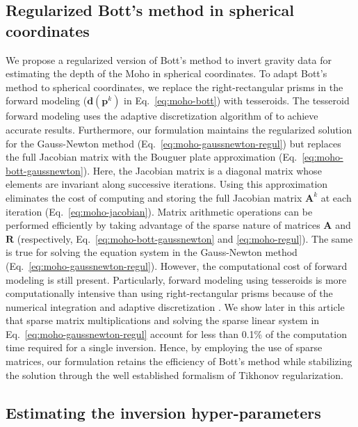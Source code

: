 \subsection{Regularized Bott's method in spherical coordinates}

We propose a regularized version of Bott's method to invert gravity data for
estimating the depth of the Moho in spherical coordinates.
To adapt Bott's method to spherical coordinates,
we replace the right-rectangular prisms in the forward modeling
($\mathbf{d}(\mathbf{p}^k)$ in Eq.~\ref{eq:moho-bott})
with tesseroids.
The tesseroid forward modeling uses the adaptive discretization algorithm
of \citet{uieda2016} to achieve accurate results.
Furthermore, our formulation maintains the regularized solution
for the Gauss-Newton method (Eq.~\ref{eq:moho-gaussnewton-regul})
but replaces the full Jacobian matrix with the Bouguer plate approximation
(Eq.~\ref{eq:moho-bott-gaussnewton}).
Here, the Jacobian matrix is a diagonal matrix whose elements are invariant
along successive iterations.
Using this approximation eliminates the cost of computing and storing
the full Jacobian matrix $\mathbf{A}^k$ at each iteration
(Eq.~\ref{eq:moho-jacobian}).
Matrix arithmetic operations can be performed efficiently by taking advantage
of the sparse nature of matrices $\mathbf{A}$ and $\mathbf{R}$
(respectively, Eq.~\ref{eq:moho-bott-gaussnewton} and \ref{eq:moho-regul}).
The same is true for solving the equation system in the Gauss-Newton method
(Eq.~\ref{eq:moho-gaussnewton-regul}).
However, the computational cost of forward modeling is still present.
Particularly, forward modeling using tesseroids is more computationally
intensive than using right-rectangular prisms
because of the numerical integration and adaptive discretization
\citep{uieda2016}.
We show later in this article that sparse matrix multiplications and solving
the sparse linear system in Eq.~\ref{eq:moho-gaussnewton-regul} account for less
than 0.1\% of the computation time required for a single inversion.
Hence, by employing the use of sparse matrices, our formulation retains the
efficiency of Bott's method while stabilizing the solution through the well
established formalism of Tikhonov regularization.



\subsection{Estimating the inversion hyper-parameters}

